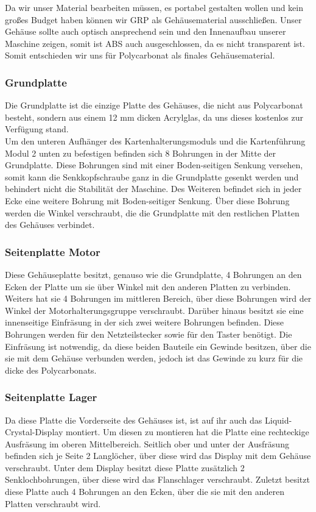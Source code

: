 Da wir unser Material bearbeiten müssen, es portabel gestalten wollen und kein großes Budget haben können wir
GRP als Gehäusematerial ausschließen. Unser Gehäuse sollte auch optisch ansprechend sein und den Innenaufbau unserer
Maschine zeigen, somit ist ABS auch ausgeschlossen, da es nicht transparent ist. Somit entschieden wir uns für
Polycarbonat als finales Gehäusematerial.

\subsubsection{Grundplatte}
Die Grundplatte ist die einzige Platte des Gehäuses, die nicht aus Polycarbonat besteht, sondern aus einem 12 mm dicken
Acrylglas, da uns dieses kostenlos zur Verfügung stand.\\
Um den unteren Aufhänger des Kartenhalterungsmoduls und die Kartenführung Modul 2 unten zu befestigen befinden sich 8
Bohrungen in der Mitte der Grundplatte. Diese Bohrungen sind mit einer Boden-seitigen Senkung versehen, somit kann die
Senkkopfschraube ganz in die Grundplatte gesenkt werden und behindert nicht die Stabilität der Maschine.
Des Weiteren befindet sich in jeder Ecke eine weitere Bohrung mit Boden-seitiger Senkung. Über diese Bohrung werden die
Winkel verschraubt, die die Grundplatte mit den restlichen Platten des Gehäuses verbindet.

\subsubsection{Seitenplatte Motor}
Diese Gehäuseplatte besitzt, genauso wie die Grundplatte, 4 Bohrungen an den Ecken der Platte um sie über Winkel
mit den anderen Platten zu verbinden. Weiters hat sie 4 Bohrungen im mittleren Bereich, über diese Bohrungen wird
der Winkel der Motorhalterungsgruppe verschraubt. Darüber hinaus besitzt sie eine innenseitige Einfräsung in der sich
zwei weitere Bohrungen befinden. Diese Bohrungen werden für den Netzteilstecker sowie für den Taster benötigt.
Die Einfräsung ist notwendig, da diese beiden Bauteile ein Gewinde besitzen, über die sie mit dem Gehäuse verbunden werden,
jedoch ist das Gewinde zu kurz für die dicke des Polycarbonats.

\subsubsection{Seitenplatte Lager}
Da diese Platte die Vorderseite des Gehäuses ist, ist auf ihr auch das Liquid-Crystal-Display montiert. Um diesen zu montieren
hat die Platte eine rechteckige Ausfräsung im oberen Mittelbereich. Seitlich ober und unter der Ausfräsung befinden sich
je Seite 2 Langlöcher, über diese wird das Display mit dem Gehäuse verschraubt.
Unter dem Display besitzt diese Platte zusätzlich 2 Senklochbohrungen, über diese wird das Flanschlager verschraubt.
Zuletzt besitzt diese Platte auch 4 Bohrungen an den Ecken, über die sie mit den anderen Platten verschraubt wird.

